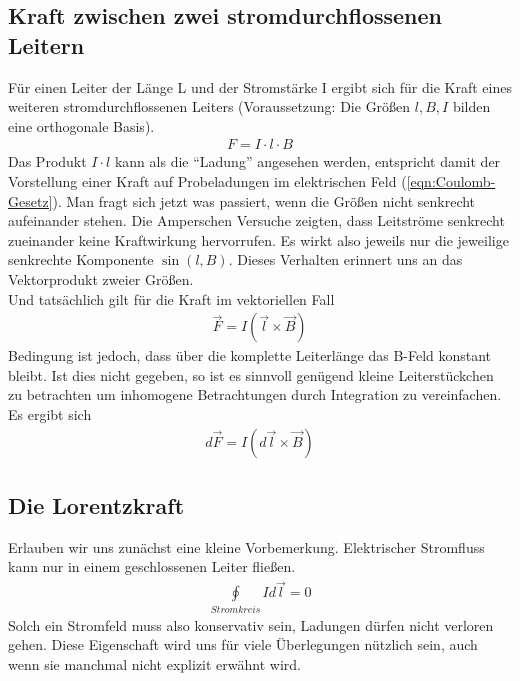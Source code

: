 \subsection{Kraft zwischen zwei stromdurchflossenen Leitern}
Für einen Leiter der Länge L und der Stromstärke I ergibt sich für die Kraft eines weiteren stromdurchflossenen Leiters (Voraussetzung: Die Größen $l,B,I$ bilden eine orthogonale Basis).
\begin{align} \label{eqn:KraftstromDruchfl}
F = I \cdot l \cdot B
\end{align} Das Produkt $I \cdot l$ kann als die "`Ladung"' angesehen werden, entspricht damit der Vorstellung einer Kraft auf  Probeladungen im elektrischen Feld (\ref{eqn:Coulomb-Gesetz}).
Man fragt sich jetzt was passiert, wenn die Größen nicht senkrecht aufeinander stehen. Die Amperschen Versuche zeigten, dass Leitströme senkrecht zueinander keine Kraftwirkung hervorrufen.
Es wirkt also jeweils nur die jeweilige senkrechte Komponente $\sin \left(l,B \right)$. Dieses Verhalten erinnert uns an das Vektorprodukt zweier Größen.
\\ Und tatsächlich gilt für die Kraft im vektoriellen Fall
\begin{align} \label{eqn:KRaftBFeld_vec}
\boxed{\vec{F} = I \left( \vec{l} \times \vec{B}\right)}
\end{align}
Bedingung ist jedoch, dass über die komplette Leiterlänge das B-Feld konstant bleibt. Ist dies nicht gegeben, so ist es sinnvoll genügend kleine Leiterstückchen zu betrachten um inhomogene Betrachtungen durch Integration zu vereinfachen. Es ergibt sich
\begin{align} \label{eqn:KraftBFeld_infintesimal}
d\vec{F} = I \left( d\vec{l} \times \vec{B}\right)
\end{align}
\subsection{Die Lorentzkraft}
Erlauben wir uns zunächst eine kleine Vorbemerkung. Elektrischer Stromfluss kann nur in einem geschlossenen Leiter fließen.
\begin{align*}
\oint \limits_{Stromkreis} I d\vec{l} = 0
\end{align*} Solch ein Stromfeld muss also konservativ sein, Ladungen dürfen nicht verloren gehen. Diese Eigenschaft wird uns für viele Überlegungen nützlich sein, auch wenn sie manchmal nicht explizit erwähnt wird.


